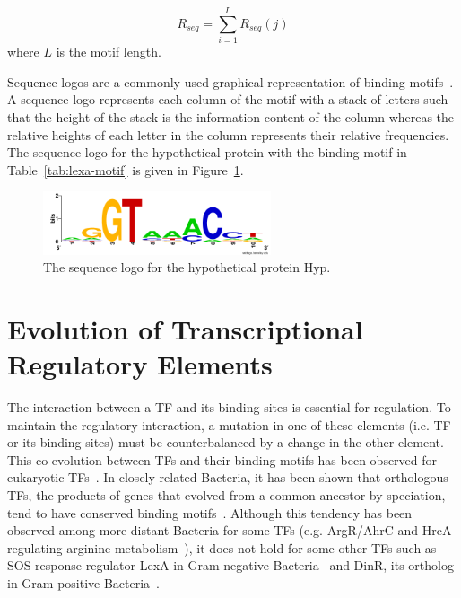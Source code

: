 \begin{equation}
  \label{eq:1}
  R_{seq} = \displaystyle\sum_{i=1}^L R_{seq}(j)
\end{equation}
where $L$ is the motif length.

Sequence logos are a commonly used graphical representation of binding
motifs~\citep{schneider1990sequence, crooks2004weblogo}. A sequence logo
represents each column of the motif with a stack of letters such that the
height of the stack is the information content of the column whereas the
relative heights of each letter in the column represents their relative
frequencies. The sequence logo for the hypothetical protein with the binding
motif in Table~\ref{tab:lexa-motif} is given in Figure~\ref{fig:lexa}.

\begin{figure}
  \centering
  \includegraphics[width=0.6\textwidth]{figures/chapter1/hyp.png}
  \caption{The sequence logo for the hypothetical protein Hyp.}
  \label{fig:lexa}
\end{figure}

\section{Evolution of Transcriptional Regulatory Elements}

The interaction between a TF and its binding sites is essential for
regulation. To maintain the regulatory interaction, a mutation in one of these
elements (i.e. TF or its binding sites) must be counterbalanced by a change in
the other element. This co-evolution between TFs and their binding motifs has
been observed for eukaryotic TFs~\citep{yang2011correlated}. In closely related
Bacteria, it has been shown that orthologous TFs, the products of genes that
evolved from a common ancestor by speciation, tend to have conserved binding
motifs~\citep{makarova2001conservation}. Although this tendency has been
observed among more distant Bacteria for some TFs (e.g. ArgR/AhrC and HrcA
regulating arginine metabolism~\citep{maas1994arginine, klingel1995binding}), it
does not hold for some other TFs such as SOS response regulator LexA in
Gram-negative Bacteria~\citep{walker1985inducible} and DinR, its ortholog in
Gram-positive Bacteria~\citep{winterling1998bacillus}.

